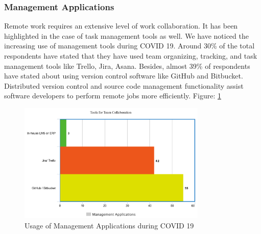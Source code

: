 \documentclass[11pt]{article}
\begin{document}
\subsubsection{Management Applications}
Remote work requires an extensive level of work collaboration. It has been highlighted in the case of task management tools as well. We have noticed the increasing use of management tools during COVID 19. Around 30\% of the total respondents have stated that they have used team organizing, tracking, and task management tools like Trello, Jira, Asana. Besides, almost 39\% of respondents have stated about using version control software like GitHub and Bitbucket. Distributed version control and source code management functionality assist software developers to perform remote jobs more efficiently. Figure: \ref{fig: Management Applications}
\begin{figure}[!ht]
	\centering
	\includegraphics[width=0.8\textwidth]{Images/Collaboration/Management Applications.png}
	\caption{Usage of Management Applications during COVID 19}
	\centering
	\label{fig: Management Applications}
\end{figure}
\end{document}
